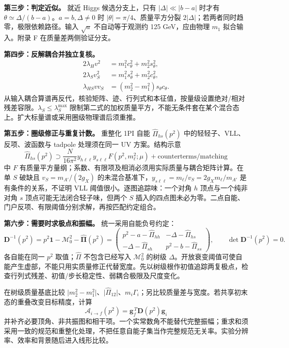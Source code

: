\documentclass[
  chinese,
  UTF8]{ctexart}
\begin{document}
\textbf{第三步：判定近似。} 就近 Higgs 候选分支上，只有
\(\lvert\Delta\rvert\ll\lvert b-a\rvert\) 时才有
\(\theta\simeq\Delta/(b-a)\)。\(a=b,\Delta\ne0\) 时
\(\lvert\theta\rvert=\pi/4\)、质量平方分裂
\(2\lvert\Delta\rvert\)；若两者同时趋零，极限依赖路径。输入 \(\sqrt a\)
不自动等于观测约 125 GeV，应由物理 \(m_1\) 拟合输入。附录 F
在质量差两侧验证分支。

\textbf{第四步：反解耦合并独立复核。} \[
\begin{aligned}
2\lambda_Hv^2&=m_1^2c_\theta^2+m_2^2s_\theta^2,\\
2\lambda_Sv_S^2&=m_1^2s_\theta^2+m_2^2c_\theta^2,\\
\lambda_{HS}vv_S&=(m_2^2-m_1^2)s_\theta c_\theta.
\end{aligned}
\]
从输入耦合算谱再反代，核验矩阵、迹、行列式和本征值，按量级设置绝对/相对残差容限。\(\lambda_S\le\lambda_S^{\max}\)
限制第二式的加权质量平方，不能无条件套在某个混合态上。扩大标量谱或采用圈级物理谱后须重推。

\textbf{第五步：圈级修正与重复计数。} 重整化 1PI 自能
\(\widehat\Pi_{hs}(p^2)\) 中的轻轻子、VLL、反项、波函数与 tadpole
处理须在同一 UV 方案。结构示意 \[
\widehat\Pi_{hs}(p^2)\supset
\frac{N}{16\pi^2}y_{h\ell\ell}y_{s\ell\ell}F(p^2,m_\ell^2;\mu)
+\text{counterterms/matching}
\] 中 \(F\)
有质量平方量纲；系数、有限项及相消必须用实际质量与耦合矩阵计算。在单
\(S\) 破缺且 \(v_S=m_{A'}/(2g_X)\)
的未混合基准下，\(y_{s\ell\ell}=m_\ell/v_S=2g_Xm_\ell/m_{A'}\)
是有条件的关系，不证明 VLL 阈值很小。逐图追踪味：一个对角 \(h\)
顶点与一个纯非对角 \(s\) 顶点可能无法闭合轻子味，但两个 \(S\)
插入的四点图未必为零。二点自能、门户反项、有限阈值分别求解，再按匹配约定组合。

\textbf{第六步：需要时求极点和振幅。} 统一采用自能负号约定： \[
\mathbf D^{-1}(p^2)=p^2\mathbf1-\mathcal M_0^2-\widehat{\boldsymbol{\Pi}}(p^2)
=\begin{pmatrix}
p^2-a-\widehat\Pi_{hh}&-\Delta-\widehat\Pi_{hs}\\
-\Delta-\widehat\Pi_{sh}&p^2-b-\widehat\Pi_{ss}
\end{pmatrix},\qquad\det\mathbf D^{-1}(p^2)=0.
\] 各自能在同一 \(p^2\) 取值；\(\widehat\Pi\) 不包含已经写入
\(\mathcal M_0^2\) 的树级
\(\Delta\)。开放衰变阈值可使自能产生虚部，不能只用实质量修正代替宽度。先以树级根作初值追踪两复极点，检查行列式残差、初值/步长稳定性、弱耦合极限及尺度变化。

在树级质量基底比较
\(\lvert m_2^2-m_1^2\rvert\)、\(\lvert\widehat\Pi_{12}\rvert\)、\(m_i\Gamma_i\)；另比较质量差与宽度。若共享初末态的重叠改变目标精度，计算
\[
\mathcal A_{i\to f}(p^2)=\mathbf g_f^{\,T}\mathbf D(p^2)\mathbf g_i
\]
并补齐必要顶角、非共振图和相干项。一个实常数角不能替代完整振幅；重求和须采用一致的规范和重整化处理，不把任意自能子集当作完整规范无关率。实验分辨率、效率和背景随后进入线形比较。
\end{document}
